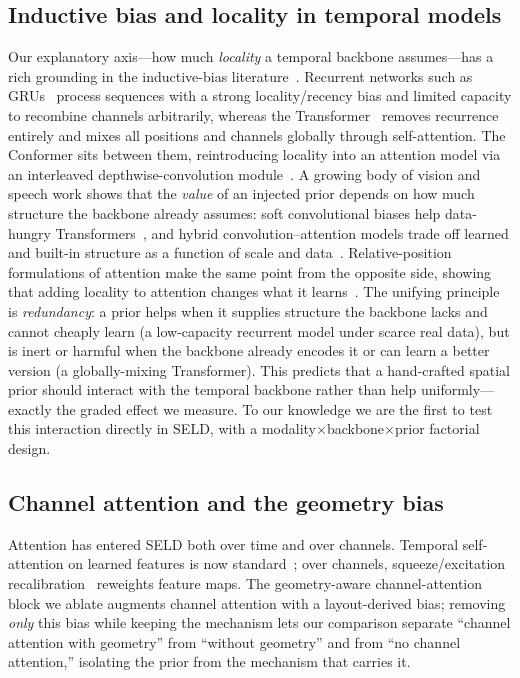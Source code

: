 \subsection{Inductive bias and locality in temporal models}
Our explanatory axis---how much \emph{locality} a temporal backbone
assumes---has a rich grounding in the inductive-bias
literature~\cite{battaglia2018relational}. Recurrent networks such as
GRUs~\cite{cho2014gru} process sequences with a strong locality/recency bias and
limited capacity to recombine channels arbitrarily, whereas the
Transformer~\cite{vaswani2017attention} removes recurrence entirely and mixes all
positions and channels globally through self-attention. The Conformer sits
between them, reintroducing locality into an attention model via an interleaved
depthwise-convolution module~\cite{gulati2020conformer}. A growing body of
vision and speech work shows that the \emph{value} of an injected prior depends
on how much structure the backbone already assumes: soft convolutional biases
help data-hungry Transformers~\cite{dascoli2021convit}, and hybrid
convolution--attention models trade off learned and built-in structure as a
function of scale and data~\cite{dai2021coatnet}. Relative-position formulations
of attention make the same point from the opposite side, showing that adding
locality to attention changes what it learns~\cite{shaw2018relative}. The
unifying principle is \emph{redundancy}: a prior helps when it supplies structure
the backbone lacks and cannot cheaply learn (a low-capacity recurrent model under
scarce real data), but is inert or harmful when the backbone already encodes it or
can learn a better version (a globally-mixing Transformer). This
predicts that a hand-crafted spatial prior should interact with the temporal
backbone rather than help uniformly---exactly the graded effect we measure. To
our knowledge we are the first to test this interaction directly in SELD, with a
modality$\times$backbone$\times$prior factorial design.

\subsection{Channel attention and the geometry bias}
Attention has entered SELD both over time and over channels. Temporal
self-attention on learned features is now standard~\cite{sudarsanam2021attention};
over channels, squeeze/excitation recalibration~\cite{hu2018senet} reweights
feature maps.
The geometry-aware channel-attention block we ablate augments channel attention
with a layout-derived bias; removing \emph{only} this bias while keeping the
mechanism lets our comparison separate ``channel attention with geometry'' from
``without geometry'' and from ``no channel attention,'' isolating the prior from
the mechanism that carries it.

